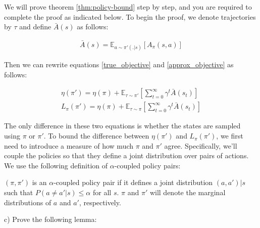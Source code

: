 We will prove theorem \ref{thm:policy-bound} step by step, and you are required to complete the proof as indicated below. To begin the proof, we denote trajectories by $\tau$ and define $\bar{A}(s)$ as follows:

\begin{align*}
    \bar{A}(s) = \mathbb{E}_{a \sim \pi'(.|s)}[A_{\pi}(s, a)]
\end{align*}

Then we can rewrite equations \ref{true_objective} and \ref{approx_objective} as follows:

\begin{align}
    \eta(\pi') = \eta(\pi) + \mathbb{E}_{\tau \sim \pi'}[\sum_{t = 0}^{\infty}\gamma^t \bar{A}(s_t)] \\
    L_{\pi}(\pi') = \eta(\pi) + \mathbb{E}_{\tau \sim \pi}[\sum_{t = 0}^{\infty}\gamma^t \bar{A}(s_t)] 
\end{align}

The only difference in these two equations is whether the states are sampled using $\pi$ or $\pi'$. To bound the difference between $\eta(\pi')$ and $L_{\pi}(\pi')$, we first need to introduce a measure of how much $\pi$ and $\pi'$ agree. Specifically, we'll couple the policies so that they define a joint distribution over pairs of actions. We use the following definition of $\alpha$-coupled policy pairs:

\begin{definition}
    $(\pi, \pi')$ is an $\alpha$-coupled policy pair if it defines a joint distribution $(a, a')|s$ such that $P(a \neq a'|s) \le \alpha$ for all $s$. $\pi$ and $\pi'$ will denote the marginal distributions of $a$ and $a'$, respectively.
\end{definition}

c) Prove the following lemma:

